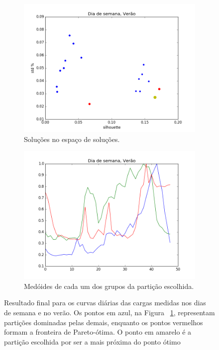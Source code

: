 \begin{figure}[!h]
	\centering
	\begin{subfigure}{.5\textwidth}
		\centering
		\includegraphics[width=.9\linewidth]{figuras/australia_5000/pareto_Dia_de_semana_Verao.png}
		\caption{Soluções no espaço de soluções.}
		\label{fig:pareto_DDS_verao}
	\end{subfigure}%
	\begin{subfigure}{.5\textwidth}
		\centering
		\includegraphics[width=.9\linewidth]{figuras/australia_5000/Dia_de_semana_Verao.png}
		\caption{Medóides de cada um dos grupos da partição escolhida.}
		\label{fig:DDS_verao}
	\end{subfigure}
	\caption{Resultado final para os curvas diárias das cargas medidas nos dias de semana e no verão. Os pontos em azul, na Figura ~\ref{fig:pareto_DDS_verao}, representam partições dominadas pelas demais, enquanto os pontos vermelhos formam a fronteira de Pareto-ótima. O ponto em amarelo é a partição escolhida por ser a mais próxima do ponto ótimo}
	\label{fig:DDS_verao_}
\end{figure}


